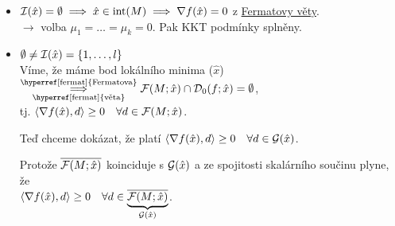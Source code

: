 \begin{itemize}
    \item $\mathcal{I}(\hat x) = \emptyset \implies \hat x \in \operatorname*{int}(M) \implies \nabla f(\hat x) = 0$ z 
    \hyperref[fermat]{Fermatovy věty}. \\
    $\rightarrow$ volba $\mu_1 = \dots = \mu_k = 0$. Pak KKT podmínky splněny.
    \item $\emptyset \not= \mathcal{I}(\hat x) = \left\lbrace 1, \dots, l \right\rbrace$\\
    Víme, že máme bod lokálního minima ($\hat x$) $\underset{\text{\hyperref[fermat]{věta}}}
    {\overset{\text{\hyperref[fermat]{Fermatova}}}{\implies}} \F(M; \hat x) \cap \D_0(f; \hat x) = \emptyset$, \\
    tj. $\langle \nabla f(\hat x), d\rangle \geq 0 \quad \forall d \in \mathcal{F}(M; \hat x)$. 

    Teď chceme dokázat, že platí $\langle \nabla f(\hat x), d\rangle \geq 0 \quad \forall d \in \mathcal{G}(\hat x)$. 

    Protože $\overline{\mathcal{F}(M; \hat x)}$ koinciduje s $\mathcal{G}(\hat x)$ a ze spojitosti skalárního součinu plyne, že \\ 
    $\langle \nabla f(\hat x), d\rangle \geq 0 \quad \forall d \in \underbrace{\overline{\mathcal{F}(M; \hat x)}}_{\mathcal{G}(\hat x)}$.


\end{itemize}
